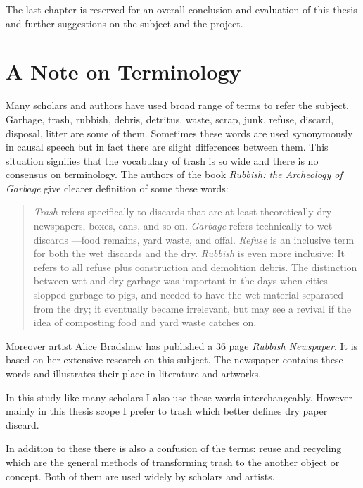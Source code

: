 The last chapter is reserved for an overall conclusion and evaluation of this thesis and further suggestions on the subject and the project.



\section{A Note on Terminology}
Many scholars and authors have used broad range of terms to refer the subject. Garbage, trash, rubbish, debris, detritus, waste, scrap, junk, refuse, discard, disposal, litter are some of them. Sometimes these words are used synonymously in causal speech but in fact there are slight differences between them. This situation signifies that the vocabulary of trash is so wide and there is no consensus on terminology. The authors of the book \textit{Rubbish: the Archeology of Garbage} give clearer definition of some these words:

\begin{quote}
\textit{Trash} refers specifically to discards that are at least theoretically dry ---newspapers, boxes, cans, and so on. \textit{Garbage} refers technically to wet discards ---food remains, yard waste, and offal. \textit{Refuse} is an inclusive term for both the wet discards and the dry. \textit{Rubbish} is even more inclusive: It refers to all refuse plus construction and demolition debris. The distinction between wet and dry garbage was important in the days when cities slopped garbage to pigs, and needed to have the wet material separated from the dry; it eventually became irrelevant, but may see a revival if the idea of composting food and yard waste catches on. \citep[9]{rathje1992rubbish}
\end{quote}

Moreover artist Alice Bradshaw has published a 36 page \textit{Rubbish Newspaper}. It is based on her extensive research on this subject. The newspaper contains these words and illustrates their place in literature and artworks.

In this study like many scholars I also use these words interchangeably. However mainly in this thesis scope I prefer to trash which better defines dry paper discard.

In addition to these there is also a confusion of the terms: reuse and recycling which are the general methods of transforming trash to the another object or concept. Both of them are used widely by scholars and artists.


